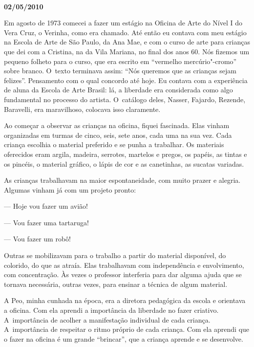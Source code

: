 \begin{center}\asterisc{}​\end{center}

\begin{flushright}\textbf{02/05/2010}\end{flushright}


Em agosto de 1973 comecei a fazer um estágio na Oficina de Arte do Nível
I do Vera Cruz, o Verinha, como era chamado. Até então eu contava com
meu estágio na Escola de Arte de São Paulo, da Ana Mae, e com o curso de
arte para crianças que dei com a Cristina, na  da Vila Mariana, no
final dos anos 60. Nós fizemos um pequeno folheto para o curso, que era
escrito em ``vermelho mercúrio"-cromo'' sobre branco. O~texto terminava
assim: ``Nós queremos que as crianças sejam felizes''. Pensamento com o
qual concordo até hoje. Eu contava com a experiência de aluna da Escola
de Arte Brasil: lá, a liberdade era considerada como algo fundamental no
processo do artista. O~catálogo deles, Nasser, Fajardo, Rezende,
Baravelli, era maravilhoso, colocava isso claramente.

Ao começar a observar as crianças na oficina, fiquei fascinada. Elas
vinham organizadas em turmas de cinco, seis, sete anos, cada uma na sua
vez. Cada criança escolhia o material preferido e se punha a trabalhar.
Os materiais oferecidos eram argila, madeira, serrotes, martelos e
pregos, os papéis, as tintas e os pincéis, o material gráfico, o lápis
de cor e as canetinhas, as sucatas variadas.

As crianças trabalhavam na maior espontaneidade, com muito prazer e
alegria. Algumas vinham já com um projeto pronto:

--- Hoje vou fazer um avião!

--- Vou fazer uma tartaruga!

--- Vou fazer um robô!

Outras se mobilizavam para o trabalho a partir do material disponível,
do colorido, do que as atraía. Elas trabalhavam com independência e
envolvimento, com concentração. Às vezes o professor interferia para
dar alguma ajuda que se tornava necessária, outras vezes, para ensinar a
técnica de algum material.

A Peo, minha cunhada na época, era a diretora pedagógica da escola e
orientava a oficina. Com ela aprendi a importância da liberdade no fazer
criativo. A~importância de acolher a manifestação individual de cada
criança. A~importância de respeitar o ritmo próprio de cada criança. Com
ela aprendi que o fazer na oficina é um grande ``brincar'', que a
criança aprende e se desenvolve.

